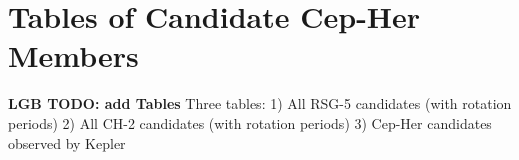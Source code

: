 \documentclass[12pt,twocolumn]{aastex63}
\begin{document}
% 
% 
% 
% 

\clearpage
                            
 

\appendix
\section{Tables of Candidate Cep-Her Members}
\label{app:members}

{\bf LGB TODO: add Tables}
Three tables:
1) All RSG-5 candidates (with rotation periods)
2) All CH-2 candidates (with rotation periods)
3) Cep-Her candidates observed by Kepler

\end{document}
